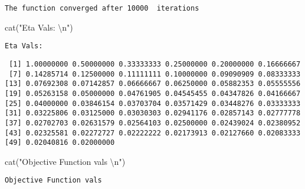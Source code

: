 \documentclass[
  letterpaper,
  DIV=11,
  numbers=noendperiod]{scrartcl}
\newenvironment{Shaded}{\begin{snugshade}}{\end{snugshade}}
\newcommand{\DecValTok}[1]{\textcolor[rgb]{0.68,0.00,0.00}{#1}}
\newcommand{\FunctionTok}[1]{\textcolor[rgb]{0.28,0.35,0.67}{#1}}
\newcommand{\NormalTok}[1]{\textcolor[rgb]{0.00,0.23,0.31}{#1}}
\newcommand{\SpecialCharTok}[1]{\textcolor[rgb]{0.37,0.37,0.37}{#1}}
\newcommand{\StringTok}[1]{\textcolor[rgb]{0.13,0.47,0.30}{#1}}
\begin{document}
\begin{verbatim}
The function converged after 10000  iterations 
\end{verbatim}

\begin{Shaded}
\begin{Highlighting}[]
\FunctionTok{cat}\NormalTok{(}\StringTok{"Eta Vals: }\SpecialCharTok{\textbackslash{}n}\StringTok{"}\NormalTok{)}
\end{Highlighting}
\end{Shaded}

\begin{verbatim}
Eta Vals: 
\end{verbatim}

\begin{Shaded}
\end{Shaded}

\begin{verbatim}
 [1] 1.00000000 0.50000000 0.33333333 0.25000000 0.20000000 0.16666667
 [7] 0.14285714 0.12500000 0.11111111 0.10000000 0.09090909 0.08333333
[13] 0.07692308 0.07142857 0.06666667 0.06250000 0.05882353 0.05555556
[19] 0.05263158 0.05000000 0.04761905 0.04545455 0.04347826 0.04166667
[25] 0.04000000 0.03846154 0.03703704 0.03571429 0.03448276 0.03333333
[31] 0.03225806 0.03125000 0.03030303 0.02941176 0.02857143 0.02777778
[37] 0.02702703 0.02631579 0.02564103 0.02500000 0.02439024 0.02380952
[43] 0.02325581 0.02272727 0.02222222 0.02173913 0.02127660 0.02083333
[49] 0.02040816 0.02000000
\end{verbatim}

\begin{Shaded}
\begin{Highlighting}[]
\FunctionTok{cat}\NormalTok{(}\StringTok{"Objective Function vals }\SpecialCharTok{\textbackslash{}n}\StringTok{"}\NormalTok{)}
\end{Highlighting}
\end{Shaded}

\begin{verbatim}
Objective Function vals 
\end{verbatim}

\begin{Shaded}
\end{Shaded}
\end{document}
